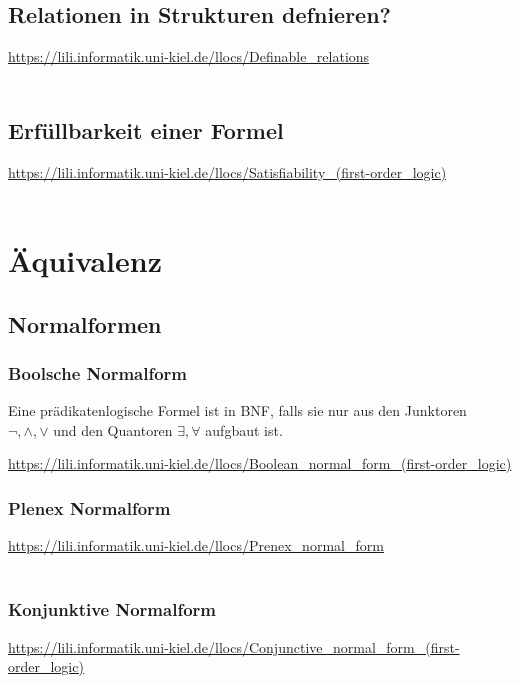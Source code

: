 \documentclass{article}
\begin{document}
    \subsection{Relationen in Strukturen defnieren?}
    \url{https://lili.informatik.uni-kiel.de/llocs/Definable_relations}\\\\

    \subsection{Erfüllbarkeit einer Formel}
    \url{https://lili.informatik.uni-kiel.de/llocs/Satisfiability_(first-order_logic)}\\\\

    \section{Äquivalenz}

    \subsection{Normalformen}

    \subsubsection{Boolsche Normalform}
    \begin{tcolorbox}
        Eine prädikatenlogische Formel ist in BNF, falls sie nur aus den Junktoren $\neg,\wedge,\vee$ und den Quantoren $\exists,\forall$ aufgbaut ist.
    \end{tcolorbox}
    \url{https://lili.informatik.uni-kiel.de/llocs/Boolean_normal_form_(first-order_logic)}

    \subsubsection{Plenex Normalform}
    \url{https://lili.informatik.uni-kiel.de/llocs/Prenex_normal_form}\\\\

    \subsubsection{Konjunktive Normalform}
    \url{https://lili.informatik.uni-kiel.de/llocs/Conjunctive_normal_form_(first-order_logic)}\\\\
\end{document}

